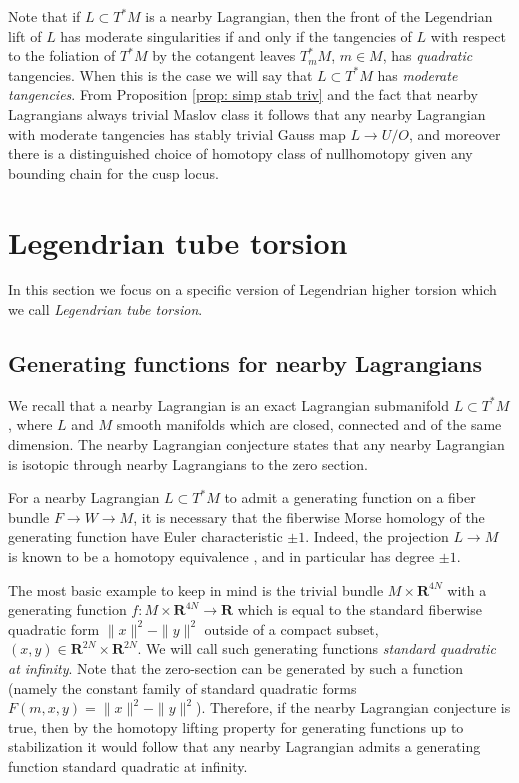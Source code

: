 \documentclass{amsart}
\def\bR{\mathbf{R}}
\theoremstyle{definition}
\theoremstyle{remark}
\newtheorem{inductive lemma}[theorem]{Inductive Lemma}
\begin{document}
Note that if $L \subset T^*M$ is a nearby Lagrangian, then the front of the Legendrian lift of $L$ has moderate singularities if and only if the tangencies of $L$ with respect to the foliation of $T^*M$ by the cotangent leaves $T^*_mM$, $m \in M$, has {\em quadratic} tangencies. When this is the case we will say that $L \subset T^*M$ has {\em moderate tangencies}. From Proposition \ref{prop: simp stab triv} and the fact that nearby Lagrangians always trivial Maslov class \cite{A12} it follows that any nearby Lagrangian with moderate tangencies has stably trivial Gauss map $L \to U/O$, and moreover there is a distinguished choice of homotopy class of nullhomotopy given any bounding chain for the cusp locus. 


\section{Legendrian tube torsion}\label{sec: tube}
  
  
In this section we focus on a specific version of Legendrian higher torsion which we call {\em Legendrian tube torsion}.

\subsection{Generating functions for nearby Lagrangians}\label{sec: gen fun nearby}

We recall that a nearby Lagrangian is an exact Lagrangian submanifold $L \subset T^*M$, where $L$ and $M$ smooth manifolds which are closed, connected and of the same dimension. The nearby Lagrangian conjecture states that any nearby Lagrangian is isotopic through nearby Lagrangians to the zero section.

For a nearby Lagrangian $L \subset T^*M$ to admit a generating function on a fiber bundle $F \to W \to M$, it is necessary that the fiberwise Morse homology of the generating function have Euler characteristic $\pm 1$. Indeed, the projection $L \to M$ is known to be a homotopy equivalence \cite{FSS, Na09, A12, Kra13, Gui12}, and in particular has degree $\pm 1$.%

The most basic example to keep in mind is the trivial bundle $M \times \bR^{4N}$ with a generating function $f:M \times \bR^{4N} \to \bR$ which is equal to the standard fiberwise quadratic form $\|x\|^2-\|y\|^2$ outside of a compact subset, $(x,y) \in \bR^{2N} \times \bR^{2N}$. We will call such generating functions {\em standard quadratic at infinity}.  Note that the zero-section can be generated by such a function (namely the constant family of standard quadratic forms $F(m,x,y)=\|x\|^2-\|y\|^2$). Therefore, if the nearby Lagrangian conjecture is true, then by the homotopy lifting property for generating functions up to stabilization it would follow that any nearby Lagrangian admits a generating function standard quadratic at infinity. 
\end{document}

